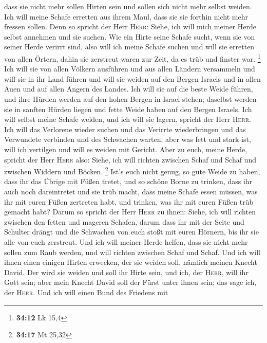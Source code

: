 dass sie nicht mehr sollen Hirten sein und sollen sich nicht mehr selbst
weiden. Ich will meine Schafe erretten aus ihrem Maul, dass sie sie
forthin nicht mehr fressen sollen.  Denn so spricht der
Herr \textsc{Herr}: Siehe, ich will mich meiner Herde selbst annehmen
und sie suchen.  Wie ein Hirte seine Schafe sucht, wenn
sie von seiner Herde verirrt sind, also will ich meine Schafe suchen und
will sie erretten von allen Örtern, dahin sie zerstreut waren zur Zeit,
da es trüb und finster war. \footnote{\textbf{34:12} Lk 15,4}
 Ich will sie von allen Völkern ausführen und aus allen
Ländern versammeln und will sie in ihr Land führen und will sie weiden
auf den Bergen Israels und in allen Auen und auf allen Angern des
Landes.  Ich will sie auf die beste Weide führen, und
ihre Hürden werden auf den hohen Bergen in Israel stehen; daselbst
werden sie in sanften Hürden liegen und fette Weide haben auf den Bergen
Israels.  Ich will selbst meine Schafe weiden, und ich
will sie lagern, spricht der Herr \textsc{Herr}.  Ich
will das Verlorene wieder suchen und das Verirrte wiederbringen und das
Verwundete verbinden und des Schwachen warten; aber was fett und stark
ist, will ich vertilgen und will es weiden mit Gericht. 
Aber zu euch, meine Herde, spricht der Herr \textsc{Herr} also: Siehe,
ich will richten zwischen Schaf und Schaf und zwischen Widdern und
Böcken. \footnote{\textbf{34:17} Mt 25,32}  Ist's euch
nicht genug, so gute Weide zu haben, dass ihr das Übrige mit Füßen
tretet, und so schöne Borne zu trinken, dass ihr auch noch dareintretet
und sie trüb macht,  dass meine Schafe essen müssen, was
ihr mit euren Füßen zertreten habt, und trinken, was ihr mit euren Füßen
trüb gemacht habt?  Darum so spricht der Herr
\textsc{Herr} zu ihnen: Siehe, ich will richten zwischen den fetten und
mageren Schafen,  darum dass ihr mit der Seite und
Schulter drängt und die Schwachen von euch stoßt mit euren Hörnern, bis
ihr sie alle von euch zerstreut.  Und ich will meiner
Herde helfen, dass sie nicht mehr sollen zum Raub werden, und will
richten zwischen Schaf und Schaf.  Und ich will ihnen
einen einigen Hirten erwecken, der sie weiden soll, nämlich meinen
Knecht David. Der wird sie weiden und soll ihr Hirte sein,
 und ich, der \textsc{Herr}, will ihr Gott sein; aber
mein Knecht David soll der Fürst unter ihnen sein; das sage ich, der
\textsc{Herr}.  Und ich will einen Bund des Friedens mit
